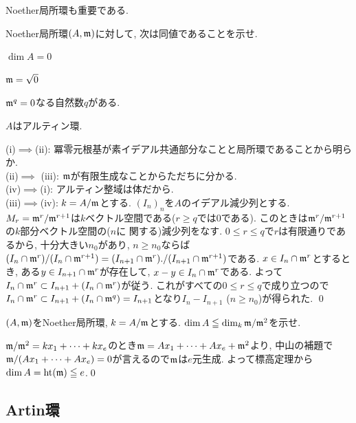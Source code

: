 Noether局所環も重要である.
\begin{egprob}
Noether局所環$(A,\mathfrak{m})$に対して, 次は同値であることを示せ.
\ben
\item $\dim{A} = 0$
\item $\mathfrak{m} = \sqrt{0}$
\item $\mathfrak{m}^q = 0$なる自然数$q$がある.
\item $A$はアルティン環.
\een
\end{egprob}
\begin{egans}
(i)$\implies$(ii): 冪零元根基が素イデアル共通部分なことと局所環であることから明らか.\\
(ii)$\implies$ (iii): $\mathfrak{m}$が有限生成なことからただちに分かる. \\
(iv)$\implies$(i): アルティン整域は体だから. \\
(iii)$\implies$(iv): $k=A/\mathfrak{m}$とする. $(I_n)_{n}$を$A$のイデアル減少列とする. $M_r = \mathfrak{m}^r/\mathfrak{m}^{r+1}$は$k$ベクトル空間である($r\geq q$では0である). このときは$\mathfrak{m}^{r}/\mathfrak{m}^{r+1}$の$k$部分ベクトル空間の($n$に
関する)減少列をなす. $0\leq r\leq q$で$r$は有限通りであるから, 十分大きい$n_0$があり, $n\geq n_0$ならば$(I_n\cap \mathfrak{m}^{r})/(I_n\cap \mathfrak{m}^{r+1}) = (I_{n+1}\cap \mathfrak{m}^{r})./(I_{n+1}\cap \mathfrak{m}^{r+1})$である. $x\in I_n\cap \mathfrak{m}^r$とするとき, ある$y\in I_{n+1}\cap \mathfrak{m}^r$が存在して, $x-y \in I_n \cap \mathfrak{m}^r$である. よって$I_{n}\cap \mathfrak{m}^r \subset I_{n+1} +  (I_n\cap \mathfrak{m}^r)$が従う. これがすべての$0\leq r\leq q$で成り立つので$I_n\cap \mathfrak{m}^r\subset I_{n+1} + (I_n \cap \mathfrak{m}^{q}) = I_{n+1}$となり$I_n - I_{n+1}$ ($n\geq n_0$)が得られた. \qed
\end{egans}

\begin{egprob}  \label{egprob:dimA_leq_m/m^2}
$(A,\mathfrak{m})$をNoether局所環, $k=A/\mathfrak{m}$とする. $\dim{A} \leqq \dim_{k}\mathfrak{m}/\mathfrak{m}^2$を示せ.
\end{egprob}
\begin{egans}
$\mathfrak{m}/\mathfrak{m}^2 = kx_1 + \dots + kx_e$のとき$\mathfrak{m} = Ax_1+\dots + Ax_e + \mathfrak{m}^2$より, 中山の補題で$\mathfrak{m}/ (Ax_1 + \dots + Ax_e) = 0$が言えるので$\mathfrak{m}$は$e$元生成. よって標高定理から$\dim{A} = \mathrm{ht}(\mathfrak{m}) \leqq e$.\qed
\end{egans}





\subsection{Artin環}

